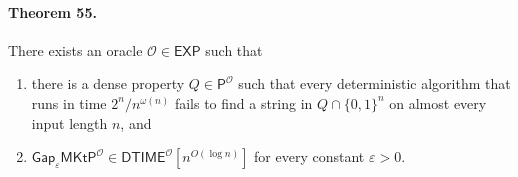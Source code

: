 \paragraph{Theorem 55.} There exists an oracle $\mathcal O\in\mathsf{EXP}$ such that
\begin{enumerate}
\item there is a dense property $Q\in\mathsf P^{\mathcal O}$ such that every deterministic algorithm that runs in time $2^n/n^{\omega(n)}$ fails to find a string in $Q\cap\{0,1\}^n$ on almost every input length $n$, and
\item $\mathsf{Gap}_{\varepsilon}\mathsf{MKtP}^{\mathcal O}\in\mathsf{DTIME}^{\mathcal O}[n^{O(\log n)}]$ for every constant $\varepsilon>0$.
\end{enumerate}
